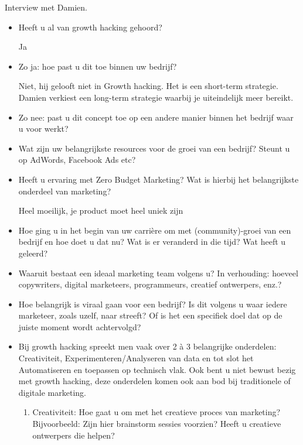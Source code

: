 Interview met Damien. 
\begin{itemize} 
	\item Heeft u al van growth hacking gehoord?
	
Ja
	
	\item Zo ja: hoe past u dit toe binnen uw bedrijf?
	
Niet, hij gelooft niet in Growth hacking. Het is een short-term strategie. Damien verkiest een long-term strategie waarbij je uiteindelijk meer bereikt.
	
	\item Zo nee: past u dit concept toe op een andere manier binnen het bedrijf waar u voor werkt?
	

	
	\item Wat zijn uw belangrijkste resources voor de groei van een bedrijf? Steunt u op AdWords, Facebook Ads etc?
	


	\item Heeft u ervaring met Zero Budget Marketing? Wat is hierbij het belangrijkste onderdeel van marketing?
	
Heel moeilijk, je product moet heel uniek zijn
	
	\item Hoe ging u in het begin van uw carrière om met (community)-groei van een bedrijf en hoe doet u dat nu? Wat is er veranderd in die tijd? Wat heeft u geleerd?
	

	
	\item Waaruit bestaat een ideaal marketing team volgens u? In verhouding: hoeveel copywriters, digital marketeers, programmeurs, creatief ontwerpers, enz.?
	
	
	
	\item Hoe belangrijk is viraal gaan voor een bedrijf? Is dit volgens u waar iedere marketeer, zoals uzelf, naar streeft? Of is het een specifiek doel dat op de juiste moment wordt achtervolgd?
	
	
	
	\item Bij growth hacking spreekt men vaak over 2 à 3 belangrijke onderdelen: Creativiteit, Experimenteren/Analyseren van data en tot slot het Automatiseren en toepassen op technisch vlak. Ook bent u niet bewust bezig met growth hacking, deze onderdelen komen ook aan bod bij traditionele of digitale marketing.
	\begin{enumerate}[label*=\arabic*.]
		\item Creativiteit: Hoe gaat u om met het creatieve proces van marketing? Bijvoorbeeld: Zijn hier brainstorm sessies voorzien? Heeft u creatieve ontwerpers die helpen?
		

\end{enumerate}
\end{itemize}
